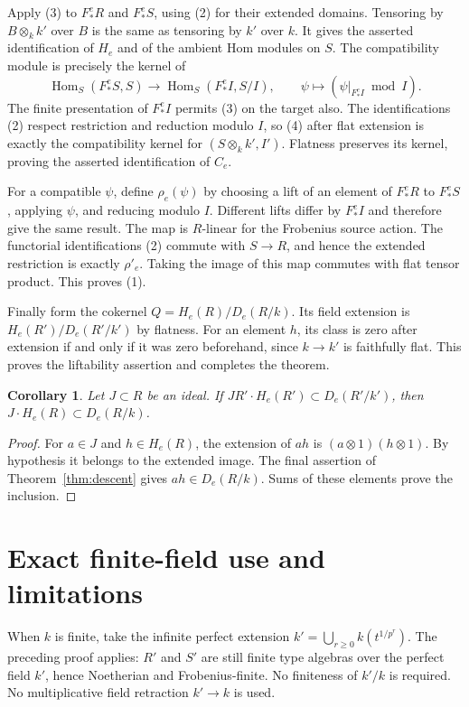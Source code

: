 \documentclass[11pt]{article}
\newtheorem{corollary}[theorem]{Corollary}
\newcommand{\Hom}{\operatorname{Hom}}
\begin{document}
Apply (3) to $F_*^eR$ and $F_*^eS$, using (2) for their extended
domains. Tensoring by $B\otimes_k k'$ over $B$ is the same as
tensoring by $k'$ over $k$. It gives the asserted identification of
$H_e$ and of the ambient Hom modules on $S$.
The compatibility module is precisely the kernel of
\[
 \Hom_S(F_*^eS,S)\longrightarrow\Hom_S(F_*^eI,S/I),\qquad
 \psi\longmapsto(\psi|_{F_*^eI}\bmod I).                 \tag{4}
\]
The finite presentation of $F_*^eI$ permits (3) on the target also.
The identifications (2) respect restriction and reduction modulo $I$,
so (4) after flat extension is exactly the compatibility kernel for
$(S\otimes_k k',I')$. Flatness preserves its kernel, proving the
asserted identification of $C_e$.

For a compatible $\psi$, define $\rho_e(\psi)$ by choosing a lift
of an element of $F_*^eR$ to $F_*^eS$, applying $\psi$, and reducing
modulo $I$. Different lifts differ by $F_*^eI$ and therefore give
the same result. The map is $R$-linear for the Frobenius source action.
The functorial identifications (2) commute with $S\to R$, and hence
the extended restriction is exactly $\rho'_e$. Taking the image of
this map commutes with flat tensor product. This proves (1).

Finally form the cokernel $Q=H_e(R)/D_e(R/k)$. Its field extension
is $H_e(R')/D_e(R'/k')$ by flatness. For an element $h$, its class
is zero after extension if and only if it was zero beforehand, since
$k\to k'$ is faithfully flat. This proves the liftability assertion
and completes the theorem.

\begin{corollary}\label{cor:ideal}
Let $J\subset R$ be an ideal. If
$J R'\cdot H_e(R')\subset D_e(R'/k')$, then
$J\cdot H_e(R)\subset D_e(R/k)$.
\end{corollary}
\begin{proof}
For $a\in J$ and $h\in H_e(R)$, the extension of $ah$ is
$(a\otimes1)(h\otimes1)$. By hypothesis it belongs to the extended
image. The final assertion of Theorem~\ref{thm:descent} gives
$ah\in D_e(R/k)$. Sums of these elements prove the inclusion.
\end{proof}

\section{Exact finite-field use and limitations}
When $k$ is finite, take the infinite perfect extension
$k'=\bigcup_{r\geq0}k(t^{1/p^r})$. The preceding proof applies:
$R'$ and $S'$ are still finite type algebras over the perfect field
$k'$, hence Noetherian and Frobenius-finite. No finiteness of $k'/k$
is required. No multiplicative field retraction $k'\to k$ is used.
\end{document}
